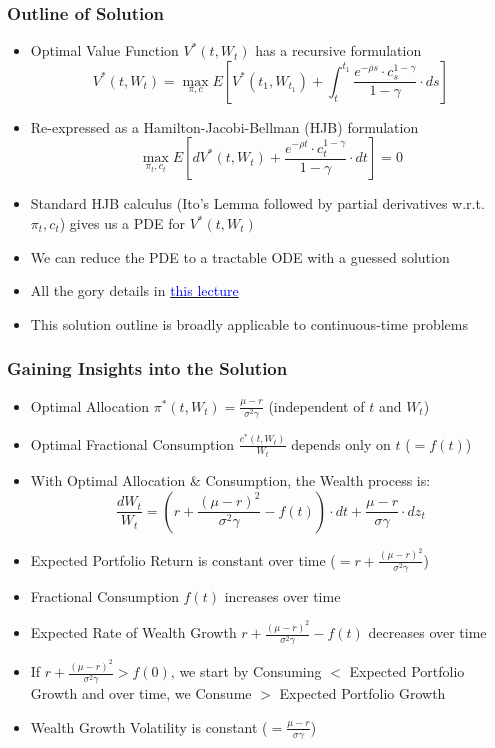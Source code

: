 \documentclass[handout]{beamer}
\begin{document}
\begin{frame}
\frametitle{Outline of Solution}
\pause
\begin{itemize}[<+->]
\item Optimal Value Function $V^*(t, W_t)$ has a recursive formulation
$$V^*(t, W_t) = \max_{\pi, c} E[V^*(t_1, W_{t_1}) + \int_t^{t_1} \frac {e^{-\rho s} \cdot c_s^{1-\gamma}} {1 - \gamma} \cdot ds]$$
\item Re-expressed as a Hamilton-Jacobi-Bellman (HJB) formulation
$$\max_{\pi_t, c_t} E[dV^*(t, W_t) + \frac {e^{-\rho t} \cdot c_t^{1-\gamma}}{1 - \gamma} \cdot dt] = 0$$
\item Standard HJB calculus (Ito's Lemma followed by partial derivatives w.r.t. $\pi_t, c_t$) gives us a PDE for $V^*(t, W_t)$
\item We can reduce the PDE to a tractable ODE with a guessed solution
\item All the gory details in \href{https://github.com/coverdrive/technical-documents/blob/master/finance/cme241/MertonPortfolio.pdf}{\underline{\textcolor{blue}{this lecture}}}
\item This solution outline is broadly applicable to continuous-time problems
\end{itemize}
\end{frame}

\begin{frame}
\frametitle{Gaining Insights into the Solution}
\begin{itemize}
\item Optimal Allocation $\pi^*(t, W_t) = \frac {\mu - r} {\sigma^2 \gamma}$ (independent of $t$ and $W_t$)
\item Optimal Fractional Consumption $\frac {c^*(t, W_t)} {W_t}$ depends only on $t$ ($= f(t)$)
\item With Optimal Allocation \& Consumption, the Wealth process is:
$$\frac {dW_t} {W_t} = (r + \frac {(\mu - r)^2} {\sigma^2 \gamma} - f(t)) \cdot dt + \frac {\mu - r} {\sigma \gamma} \cdot dz_t$$
\item Expected Portfolio Return is constant over time ($=r + \frac {(\mu - r)^2} {\sigma^2 \gamma}$)
\item Fractional Consumption $f(t)$ increases over time
\item Expected Rate of Wealth Growth $r + \frac {(\mu - r)^2} {\sigma^2 \gamma} - f(t)$ decreases over time
\item If $r + \frac {(\mu - r)^2} {\sigma^2 \gamma} > f(0)$, we start by Consuming $<$ Expected Portfolio Growth and over time, we Consume $>$ Expected Portfolio Growth
\item Wealth Growth Volatility is constant ($= \frac {\mu - r} {\sigma \gamma}$)
\end{itemize}

\end{frame}
\end{document}
